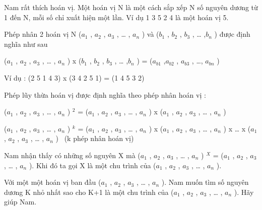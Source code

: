Nam rất thích hoán vị. Một hoán vị N là một cách sắp xếp N số nguyên dương từ 1 đến N, mỗi số chỉ xuất hiện một lần. Ví dụ 1 3 5 2 4 là một hoán vị 5.

Phép nhân 2 hoán vị N ($a_{1}$ , $a_{2}$ , $a_{3}$ , … , $a_{n}$ ) và ($b_{1}$ , $b_{2}$ , $b_{3}$ , … ,$b_{n}$ ) được định nghĩa như sau


($a_{1}$ , $a_{2}$ , $a_{3}$ , … , $a_{n}$ ) x ($b_{1}$ , $b_{2}$ , $b_{3}$ , … ,$b_{n}$ ) = ($a_{b1}$ ,$a_{b2}$ , $a_{b3}$ , …, $a_{bn}$ )


Ví dụ : (2 5 1 4 3) x (3 4 2 5 1) = (1 4 5 3 2)

Phép lũy thừa hoán vị được định nghĩa theo phép nhân hoán vị :


($a_{1}$ , $a_{2}$ , $a_{3}$ , … , $a_{n}$ ) $^ 2 $ = ($a_{1}$ , $a_{2}$ , $a_{3}$ , … , $a_{n}$ ) x ($a_{1}$ , $a_{2}$ , $a_{3}$ , … , $a_{n}$ )


($a_{1}$ , $a_{2}$ , $a_{3}$ , … , $a_{n}$ ) $^ k $ = ($a_{1}$ , $a_{2}$ , $a_{3}$ , … , $a_{n}$ ) x ($a_{1}$ , $a_{2}$ , $a_{3}$ , … , $a_{n}$ ) x … x ($a_{1}$ , $a_{2}$ , $a_{3}$ , … , $a_{n}$ )  (k phép nhân hoán vị)





Nam nhận thấy có những số nguyên X mà ($a_{1}$ , $a_{2}$ , $a_{3}$ , … , $a_{n}$ ) $^ X $ = ($a_{1}$ , $a_{2}$ , $a_{3}$ , … , $a_{n}$ ). Khi đó ta gọi X là một chu trình của ($a_{1}$ , $a_{2}$ , $a_{3}$ , … , $a_{n}$ ).


Với một một hoán vị ban đầu ($a_{1}$ , $a_{2}$ , $a_{3}$ , … , $a_{n}$ ). Nam muốn tìm số nguyên dương K nhỏ nhất sao cho K+1 là một chu trình của ($a_{1}$ , $a_{2}$ , $a_{3}$ , … , $a_{n}$ ). Hãy giúp Nam.